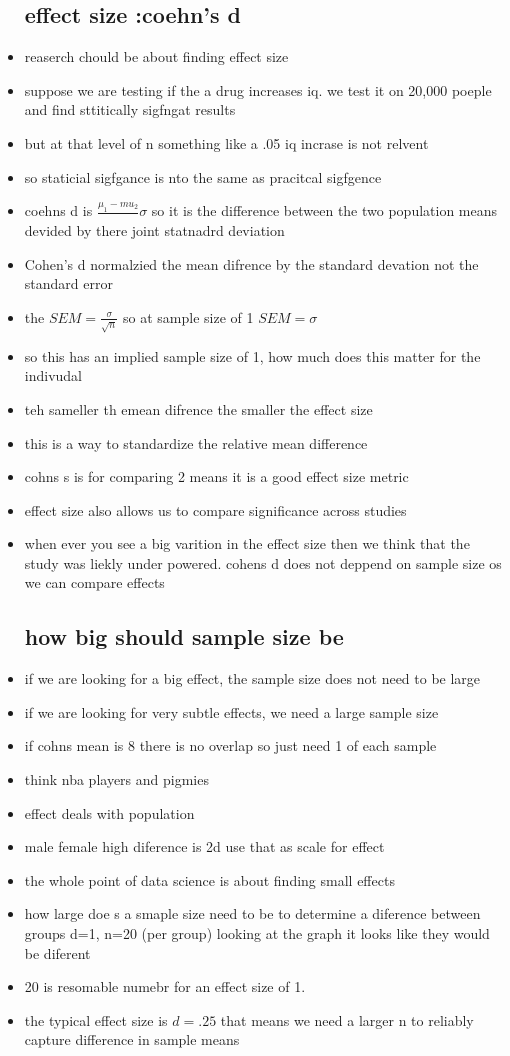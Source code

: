\documentclass{article}
\begin{document}
\begin{itemize}
\subsection{effect size :coehn's d}
\item reaserch chould be about finding effect size 
\item suppose we are testing if the a drug increases iq. we test it on 20,000 poeple and find sttitically sigfngat results 
\item but at that level of n something like a .05 iq incrase is not relvent 
\item so staticial sigfgance is nto the same as pracitcal sigfgence 
\item coehns d is $\frac{\mu_1-mu_2}{}\sigma$ so it is the difference between the two population means devided by there joint statnadrd deviation 
\item Cohen's d normalzied the mean difrence by the standard devation not the standard error
\item the $SEM=\frac{\sigma}{\sqrt{n}}$ so at sample size of 1 $SEM=\sigma$
\item so this has an implied sample size of 1, how much does this matter for the indivudal 
\item teh sameller th emean difrence the smaller the effect size
\item this is a way to standardize the relative mean difference
\item cohns s is for comparing 2 means it is a good effect size metric 
\item effect size also allows us to compare significance across studies 
\item when ever you see a big varition in the effect size then we think that the study was liekly under powered. 
\itme cohens d does not deppend on sample size os we can compare effects
\subsection{how big should sample size be}
\item if we are looking for a big effect, the sample size does not need to be large 
\item if we are looking for very subtle effects, we need a large sample size
\item if cohns mean is 8 there is no overlap so just need 1 of each sample
\item think nba players and pigmies
\item effect deals with population 
\item male female high diference is 2d use that as scale for effect
\item the whole point of data science is about finding small effects
\item how large doe s a smaple size need to be to determine a diference between groups 
\itme d=1, n=20 (per group) looking at the graph it looks like they would be diferent 
\item 20 is resomable numebr for an effect size of 1. 
\item the typical effect size is $d=.25$ that means we need a larger n to reliably capture difference in sample means

\end{itemize}
\end{document}
